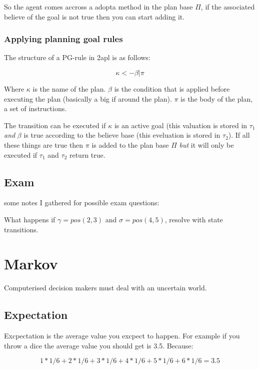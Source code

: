\documentclass{article}
\begin{document}
So the agent comes accross a adopta method in the plan base $\Pi$, if
the associated believe of the goal is not true then you can start adding
it.
\subsubsection{Applying planning goal rules}
The structure of a PG-rule in 2apl is as follows:

\[\kappa <- \beta | \pi \]

Where $\kappa$ is the name of the plan.
$\beta$ is the condition that is applied before
executing the plan (basically a big if around the plan). $\pi$ is
the body of the plan, a set of instructions.

\begin{prooftree}
\end{prooftree}

The transition can be executed if $\kappa$ is an active goal (this valuation
is stored in $\tau_1$ \emph{and} $\beta$ is true according to the believe 
base (this eveluation is stored in $\tau_2$). If all these things are true
then $\pi$ is added to the plan base $\Pi$ \emph{but} it will only be executed
if $\tau_1$ and $\tau_2$ return true.
\subsection{Exam}
some notes I gathered for possible exam questions:

What happens if $\gamma = pos(2,3)$ and $\sigma = pos(4,5)$, resolve with
state transitions.

\section{Markov}
Computerised decision makers must deal with an uncertain world.

\subsection{Expectation}
Excpectation is the average value you excpect to happen. For example if you
throw a dice the average value you should get is 3.5. Because:

\[1 * 1/6 + 2 * 1/6 + 3 * 1/6 + 4 * 1/6 + 5 * 1/6 + 6 * 1/6 = 3.5\]
\end{document}
